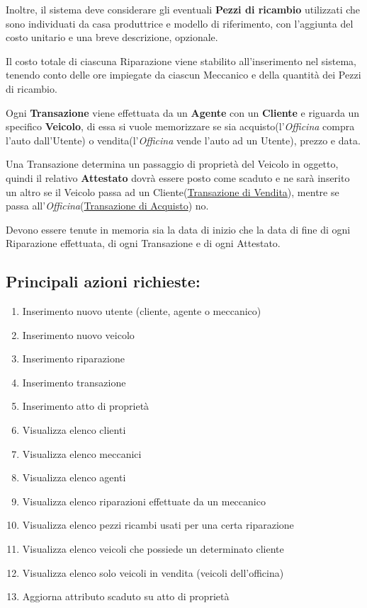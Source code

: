 \documentclass[a4paper,12pt]{report}
\begin{document}
Inoltre, il sistema deve considerare gli eventuali \textbf{Pezzi di ricambio} utilizzati che sono individuati da 
%
casa produttrice e modello di riferimento, con l'aggiunta del costo unitario e una breve descrizione, opzionale.

Il costo totale di ciascuna Riparazione viene stabilito all'inserimento nel sistema, tenendo conto delle ore 
%
impiegate da ciascun Meccanico e della quantità dei Pezzi di ricambio.

Ogni \textbf{Transazione} viene effettuata da un \textbf{Agente} con un \textbf{Cliente} e riguarda un specifico \textbf{Veicolo},
%
di essa si vuole memorizzare se sia acquisto(l'\textit{Officina} compra l'auto dall'Utente) o vendita(l'\textit{Officina} 
% 
vende l'auto ad un Utente), prezzo e data. 

Una Transazione determina un passaggio di proprietà del Veicolo in oggetto, quindi il relativo \textbf{Attestato} 
%
dovrà essere posto come scaduto e ne sarà inserito un altro se il Veicolo passa ad un Cliente(\underline{Transazione di Vendita}),
%
mentre se passa all'\textit{Officina}(\underline{Transazione di Acquisto}) no.

Devono essere tenute in memoria sia la data di inizio che la data di fine di ogni Riparazione effettuata, di ogni Transazione e di 
%
ogni Attestato.

\subsection*{Principali azioni richieste:}
\begin{enumerate}
	\item Inserimento nuovo utente (cliente, agente o meccanico)
	\item Inserimento nuovo veicolo
	\item Inserimento riparazione
	\item Inserimento transazione
	\item Inserimento atto di proprietà
	\item Visualizza elenco clienti
	\item Visualizza elenco meccanici
	\item Visualizza elenco agenti
	\item Visualizza elenco riparazioni effettuate da un meccanico
	\item Visualizza elenco pezzi ricambi usati per una certa riparazione
	\item Visualizza elenco veicoli che possiede un determinato cliente
	\item Visualizza elenco solo veicoli in vendita (veicoli dell'officina)
	\item Aggiorna attributo scaduto su atto di proprietà
\end{enumerate}
\end{document}
